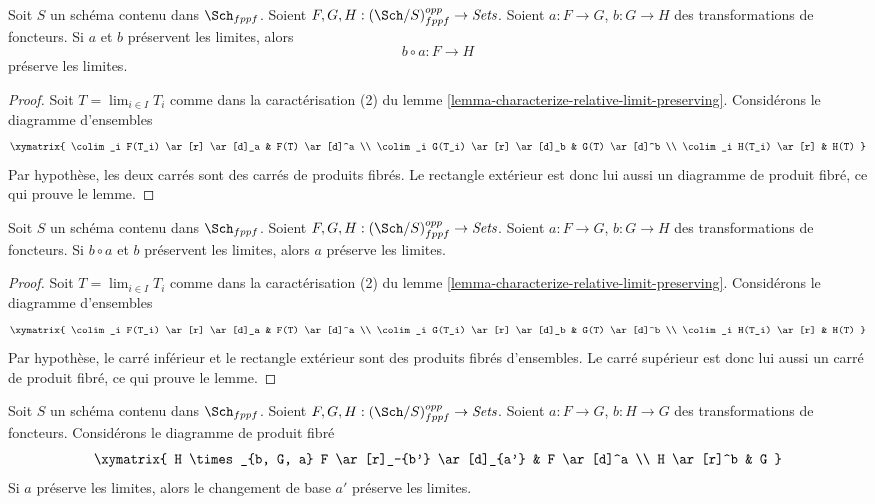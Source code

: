 \begin{lemma}
\label{lemma-composition-locally-finite-presentation}
Soit $S$ un schéma contenu dans $\Sch_{fppf}$.
Soient $F, G, H : (\Sch/S)_{fppf}^{opp} \to \textit{Sets}$.
Soient $a : F \to G$, $b : G \to H$ des transformations de foncteurs.
Si $a$ et $b$ préservent les limites, alors
$$
b \circ a : F \longrightarrow H
$$
préserve les limites.
\end{lemma}

\begin{proof}
Soit $T = \lim_{i \in I} T_i$ comme dans la caractérisation (2) du
lemme \ref{lemma-characterize-relative-limit-preserving}.
Considérons le diagramme d'ensembles
$$
\xymatrix{
\colim_i F(T_i) \ar[r] \ar[d]_a & F(T) \ar[d]^a \\
\colim_i G(T_i) \ar[r] \ar[d]_b & G(T) \ar[d]^b \\
\colim_i H(T_i) \ar[r] & H(T)
}
$$
Par hypothèse, les deux carrés sont des carrés de produits fibrés. Le
rectangle extérieur est donc lui aussi un diagramme de produit fibré, ce qui prouve le lemme.
\end{proof}

\begin{lemma}
\label{lemma-locally-finite-presentation-permanence}
Soit $S$ un schéma contenu dans $\Sch_{fppf}$.
Soient $F, G, H : (\Sch/S)_{fppf}^{opp} \to \textit{Sets}$.
Soient $a : F \to G$, $b : G \to H$ des transformations de foncteurs.
Si $b \circ a$ et $b$ préservent les limites, alors $a$
préserve les limites.
\end{lemma}

\begin{proof}
Soit $T = \lim_{i \in I} T_i$ comme dans la caractérisation (2) du
lemme \ref{lemma-characterize-relative-limit-preserving}.
Considérons le diagramme d'ensembles
$$
\xymatrix{
\colim_i F(T_i) \ar[r] \ar[d]_a & F(T) \ar[d]^a \\
\colim_i G(T_i) \ar[r] \ar[d]_b & G(T) \ar[d]^b \\
\colim_i H(T_i) \ar[r] & H(T)
}
$$
Par hypothèse, le carré inférieur et le rectangle extérieur
sont des produits fibrés d'ensembles. Le carré supérieur
est donc lui aussi un carré de produit fibré, ce qui prouve le lemme.
\end{proof}

\begin{lemma}
\label{lemma-base-change-locally-finite-presentation}
Soit $S$ un schéma contenu dans $\Sch_{fppf}$.
Soient $F, G, H : (\Sch/S)_{fppf}^{opp} \to \textit{Sets}$.
Soient $a : F \to G$, $b : H \to G$ des transformations de foncteurs.
Considérons le diagramme de produit fibré
$$
\xymatrix{
H \times_{b, G, a} F \ar[r]_-{b'} \ar[d]_{a'} & F \ar[d]^a \\
H \ar[r]^b & G
}
$$
Si $a$ préserve les limites, alors le changement de base $a'$ préserve les limites.
\end{lemma}

